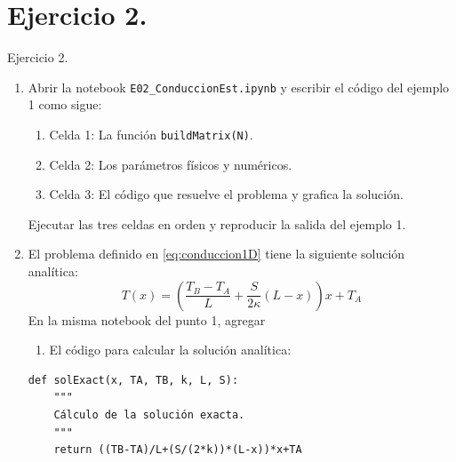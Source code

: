 \documentclass{beamer}
\begin{document}
\section{Ejercicio 2.}

\begin{frame}[fragile]
	
{\small 
\begin{exampleblock}{Ejercicio 2.}
\begin{enumerate}
	\item Abrir la notebook \texttt{E02\_ConduccionEst.ipynb} y escribir el código del ejemplo 1 como sigue:
 	\begin{enumerate}[a]
		\item {\footnotesize Celda 1: La función \texttt{buildMatrix(N)}.}
		\item {\footnotesize Celda 2: Los parámetros físicos y numéricos.}
		\item {\footnotesize Celda 3: El código que resuelve el problema y grafica la solución.}
	\end{enumerate}
	Ejecutar las tres celdas en orden y reproducir la salida del ejemplo 1.
	\item El problema definido en \eqref{eq:conduccion1D} tiene la siguiente solución analítica:
	$$\displaystyle
	T(x) =
	\boxed{\left(\frac{T_B - T_A}{L} + \frac{S}{2\kappa} \left(L - x\right) \right)x + T_A}
	$$
	En la misma notebook del punto 1, agregar 
	\begin{enumerate}[a]
	\item El código para calcular la solución analítica:
	\end{enumerate}
\begin{lstlisting}
def solExact(x, TA, TB, k, L, S):
    """
    Cálculo de la solución exacta.
    """
    return ((TB-TA)/L+(S/(2*k))*(L-x))*x+TA
\end{lstlisting}

\end{enumerate}
\end{exampleblock}
}
\end{frame}
\end{document}
